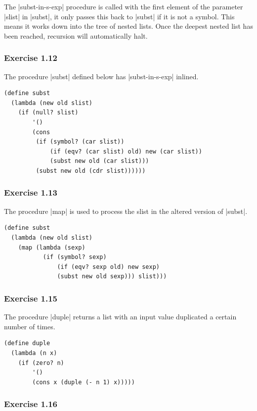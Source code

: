 \documentclass[a4paper]{article}
\begin{document}
The |subst-in-s-exp| procedure is called with the first element of the parameter |slist| in |subst|, it only passes this back to |subst| if it is not a symbol. This means it works down into the tree of nested lists. Once the deepest nested list has been reached, recursion will automatically halt.

\subsubsection{Exercise 1.12}

The procedure |subst| defined below has |subst-in-s-exp| inlined.

\begin{lstlisting}
(define subst
  (lambda (new old slist)
    (if (null? slist)
        '()
        (cons
         (if (symbol? (car slist))
             (if (eqv? (car slist) old) new (car slist))
             (subst new old (car slist)))
         (subst new old (cdr slist))))))
\end{lstlisting}

\subsubsection{Exercise 1.13}

The procedure |map| is used to process the slist in the altered version of |subst|.

\begin{lstlisting}
(define subst
  (lambda (new old slist)
    (map (lambda (sexp)
           (if (symbol? sexp)
               (if (eqv? sexp old) new sexp)
               (subst new old sexp))) slist)))
\end{lstlisting}

\subsubsection{Exercise 1.15}

The procedure |duple| returns a list with an input value duplicated a certain number of times.

\begin{lstlisting}
(define duple
  (lambda (n x)
    (if (zero? n)
        '()
        (cons x (duple (- n 1) x)))))
\end{lstlisting}

\subsubsection{Exercise 1.16}
\end{document}

